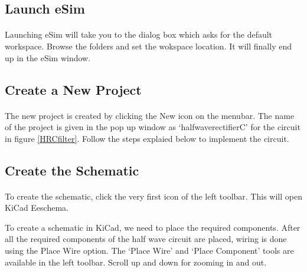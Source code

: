 \subsection*{Launch eSim}

\paragraph{}
 Launching eSim will take you to the dialog box which asks for the default workspace. Browse the folders and set the wokspace location. It will finally end up in the eSim window.%

\subsection*{Create a New Project}

\paragraph{ } The new project is created by clicking the New icon on the
menubar. The name of the project is given in the pop up window as `halfwaverectifierC' for the circuit in figure \ref{HRCfilter}. Follow the steps explaied below to implement the circuit.
\subsection*{Create the Schematic}

\paragraph{}  To create the schematic, click the very first icon of the
left toolbar. This will open KiCad Eeschema.


To create a schematic in KiCad, we need to place the required components. After all the required components of the half wave circuit are placed, wiring is
done using the Place Wire option. The `Place Wire' and `Place Component' tools are available in the left toolbar. Scroll up and down for zooming in and out.




